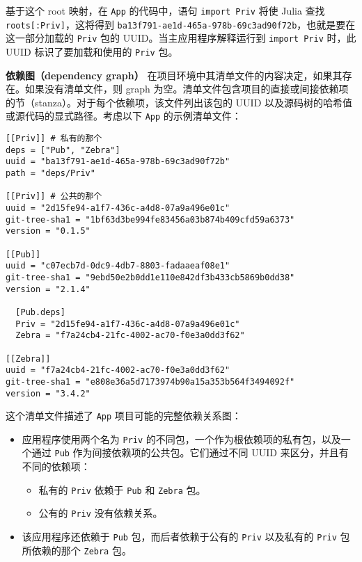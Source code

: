 基于这个 root 映射，在 \texttt{App} 的代码中，语句 \texttt{import Priv} 将使 Julia 查找 \texttt{roots[:Priv]}，这将得到 \texttt{ba13f791-ae1d-465a-978b-69c3ad90f72b}，也就是要在这一部分加载的 \texttt{Priv} 包的 UUID。当主应用程序解释运行到 \texttt{import Priv} 时，此 UUID 标识了要加载和使用的 \texttt{Priv} 包。



\textbf{依赖图（dependency graph）} 在项目环境中其清单文件的内容决定，如果其存在。如果没有清单文件，则 graph 为空。清单文件包含项目的直接或间接依赖项的节（stanza）。对于每个依赖项，该文件列出该包的 UUID 以及源码树的哈希值或源代码的显式路径。考虑以下 \texttt{App} 的示例清单文件：




\begin{lstlisting}
[[Priv]] # 私有的那个
deps = ["Pub", "Zebra"]
uuid = "ba13f791-ae1d-465a-978b-69c3ad90f72b"
path = "deps/Priv"

[[Priv]] # 公共的那个
uuid = "2d15fe94-a1f7-436c-a4d8-07a9a496e01c"
git-tree-sha1 = "1bf63d3be994fe83456a03b874b409cfd59a6373"
version = "0.1.5"

[[Pub]]
uuid = "c07ecb7d-0dc9-4db7-8803-fadaaeaf08e1"
git-tree-sha1 = "9ebd50e2b0dd1e110e842df3b433cb5869b0dd38"
version = "2.1.4"

  [Pub.deps]
  Priv = "2d15fe94-a1f7-436c-a4d8-07a9a496e01c"
  Zebra = "f7a24cb4-21fc-4002-ac70-f0e3a0dd3f62"

[[Zebra]]
uuid = "f7a24cb4-21fc-4002-ac70-f0e3a0dd3f62"
git-tree-sha1 = "e808e36a5d7173974b90a15a353b564f3494092f"
version = "3.4.2"
\end{lstlisting}



这个清单文件描述了 \texttt{App} 项目可能的完整依赖关系图：



\begin{itemize}
\item 应用程序使用两个名为 \texttt{Priv} 的不同包，一个作为根依赖项的私有包，以及一个通过 \texttt{Pub} 作为间接依赖项的公共包。它们通过不同 UUID 来区分，并且有不同的依赖项：

\begin{itemize}
\item 私有的 \texttt{Priv} 依赖于 \texttt{Pub} 和 \texttt{Zebra} 包。


\item 公有的 \texttt{Priv} 没有依赖关系。

\end{itemize}

\item 该应用程序还依赖于 \texttt{Pub} 包，而后者依赖于公有的 \texttt{Priv} 以及私有的 \texttt{Priv} 包所依赖的那个 \texttt{Zebra} 包。

\end{itemize}


